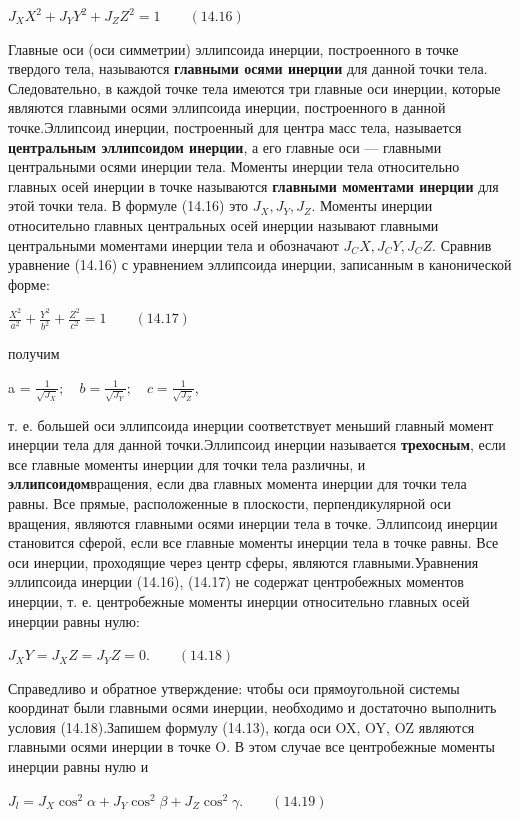 {\begin{center}
    \par $J_X X^2 + J_Y Y^2 + J_Z Z^2 = 1 \qquad (14.16)$
    \par Главные  оси  (оси  симметрии)  эллипсоида  инерции,  построенного  в точке твердого тела, называются \textbf{главными осями инерции} для данной точки тела. Следовательно, в каждой точке тела имеются три главные оси инерции, которые являются главными осями эллипсоида инерции, построенного в данной точке.Эллипсоид  инерции,  построенный  для  центра  масс  тела,  называется \textbf{центральным эллипсоидом инерции}, а его главные оси — главными центральными  осями  инерции  тела.  Моменты  инерции  тела  относительно  главных осей инерции в точке называются \textbf{главными моментами инерции} для этой точки тела. В формуле (14.16)  это $J_X, J_Y, J_Z$. Моменты инерции относительно главных центральных осей инерции называют главными центральными моментами инерции тела и обозначают $J_CX, J_CY, J_CZ$. Сравнив уравнение (14.16) с уравнением эллипсоида инерции, записанным в канонической форме:

    \par $\frac{X^2}{a^2} + \frac{Y^2}{b^2} + \frac{Z^2}{c^2} = 1 \qquad (14.17)$
    \par получим
    \par a = $\frac{1}{\sqrt{J_X}}; \quad b = \frac{1}{\sqrt{J_Y}}; \quad c = \frac{1}{\sqrt{J_Z}}$,

    \par т. е. большей оси эллипсоида инерции соответствует меньший главный момент инерции тела для данной точки.Эллипсоид инерции называется \textbf{трехосным}, если все главные моменты инерции для  точки  тела  различны,  и  \textbf{эллипсоидом}вращения,  если  два  главных  момента  инерции  для  точки  тела  равны.  Все  прямые,  расположенные в плоскости, перпендикулярной оси вращения, являются главными осями инерции тела в точке. Эллипсоид инерции становится сферой, если все главные моменты инерции тела в точке равны. Все оси инерции, проходящие через центр сферы, являются главными.Уравнения эллипсоида инерции (14.16), (14.17) не содержат центробежных моментов инерции, т. е. центробежные моменты инерции относительно главных осей инерции равны нулю:
    \par $J_XY = J_XZ = J_YZ = 0. \qquad (14.18)$
    \par Справедливо  и  обратное  утверждение: чтобы оси прямоугольной системы  координат были главными осями инерции, необходимо и достаточно выполнить условия (14.18).Запишем формулу (14.13), когда оси OX, OY, OZ являются главными осями инерции в точке O. В этом случае все центробежные моменты инерции равны нулю и
    \par $J_l = J_X \cos^2{\alpha} + J_Y \cos^2{\beta} + J_Z \cos^2{\gamma}. \qquad (14.19)$


\end{center}}
